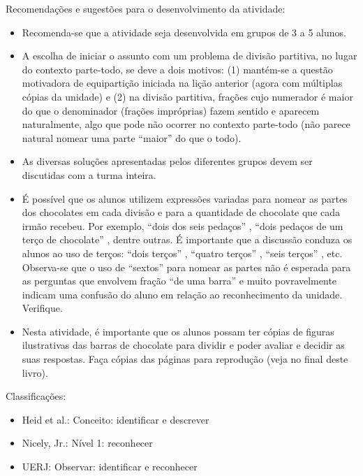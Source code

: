 \documentclass[oneside]{book}
\begin{document}
\begin{multicols}{2}
  Recomendações e sugestões para o desenvolvimento da atividade:
\begin{itemize} %
    \item       Recomenda-se que a atividade seja desenvolvida em grupos de 3 a 5 alunos.
    \item       A escolha de iniciar o assunto com um problema de divisão partitiva, no lugar do contexto parte-todo, se deve a dois motivos: (1) mantém-se a questão motivadora de equipartição iniciada na lição anterior (agora com múltiplas cópias da unidade) e (2) na divisão partitiva, frações cujo numerador é maior do que o denominador (frações impróprias) fazem sentido e aparecem naturalmente, algo que pode não ocorrer no contexto parte-todo (não parece natural nomear uma parte       ``maior''       do que o todo).
    \item       As diversas soluções apresentadas pelos diferentes grupos devem ser discutidas com a turma inteira.
    \item       É possível que os alunos utilizem expressões variadas para nomear as partes dos chocolates em cada divisão e para a quantidade de chocolate que cada irmão recebeu. Por exemplo,       ``dois dos seis pedaços''      ,       ``dois pedaços de um terço de chocolate''      , dentre outras. É importante que a discussão conduza os alunos ao uso de terços:       ``dois terços''      ,       ``quatro terços''      ,       ``seis terços''      , etc. Observa-se que o uso de       ``sextos''       para nomear as partes não é esperada para as perguntas que envolvem fração       ``de uma barra''       e muito povravelmente indicam uma confusão do aluno em relação ao reconhecimento da unidade. Verifique.
    \item       Nesta atividade, é importante que os alunos possam ter cópias de figuras ilustrativas das barras de chocolate para dividir e poder avaliar e decidir as suas respostas. Faça cópias das páginas para reprodução (veja no final deste livro).
\end{itemize} %


  Classificações:
\begin{itemize} %
    \item       Heid et al.: Conceito: identificar e descrever
    \item       Nicely, Jr.: Nível 1: reconhecer
    \item       UERJ: Observar: identificar e reconhecer
\end{itemize} %


\end{multicols}
\end{document}
